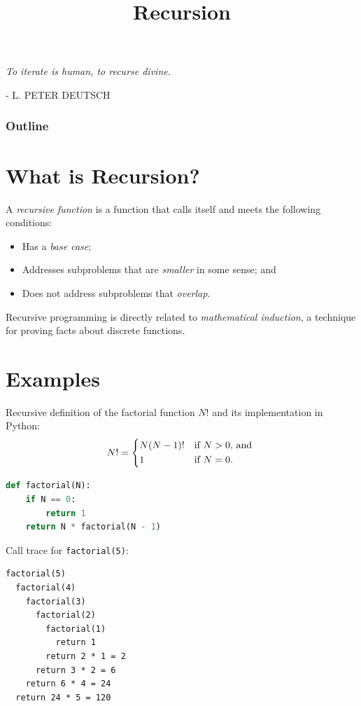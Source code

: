 \documentclass[8pt,a4paper,compress,handout]{beamer}
\title{Recursion}
\date{}
\begin{document}
\begin{frame}
\hfill
\begin{minipage}{150pt}
\begin{flushright}
\tiny \emph{To iterate is human, to recurse divine.}

\smallskip

- L. PETER DEUTSCH
\end{flushright}
\end{minipage}
\titlepage
\end{frame}

\begin{frame}
\frametitle{Outline}
\tableofcontents
\end{frame}

\section{What is Recursion?}
\begin{frame}[fragile]
A \emph{recursive function} is a function that calls itself and meets the following conditions:
\begin{itemize}
\item Has a \emph{base case}; 
\item Addresses subproblems that are \emph{smaller} in some sense; and
\item Does not address subproblems that \emph{overlap}.
\end{itemize}

\bigskip

Recursive programming is directly related to \emph{mathematical induction}, a technique for proving facts about discrete functions.
\end{frame}

\section{Examples}
\begin{frame}[fragile]
Recursive definition of the factorial function $N!$ and its implementation in Python: 
\[
N! = \begin{dcases*}
N(N-1)! & if $N > 0$, and \\
1       & if $N=0$.
\end{dcases*}
\]

\begin{lstlisting}[language=Python]
def factorial(N):
    if N == 0:
        return 1
    return N * factorial(N - 1)
\end{lstlisting}

\bigskip

Call trace for \lstinline{factorial(5)}:
\begin{lstlisting}[language={}]
factorial(5)
  factorial(4)
    factorial(3)
      factorial(2)
        factorial(1)
          return 1
        return 2 * 1 = 2
      return 3 * 2 = 6
    return 6 * 4 = 24
  return 24 * 5 = 120
\end{lstlisting}
\end{frame}
\end{document}
